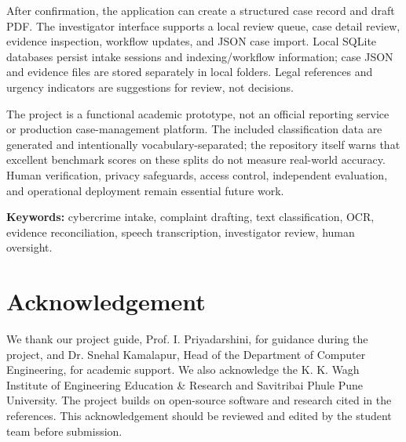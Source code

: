 \documentclass[12pt,a4paper,oneside]{report}
\begin{document}
After confirmation, the application can create a structured case record and draft PDF. The investigator interface supports a local review queue, case detail review, evidence inspection, workflow updates, and JSON case import. Local SQLite databases persist intake sessions and indexing/workflow information; case JSON and evidence files are stored separately in local folders. Legal references and urgency indicators are suggestions for review, not decisions.

The project is a functional academic prototype, not an official reporting service or production case-management platform. The included classification data are generated and intentionally vocabulary-separated; the repository itself warns that excellent benchmark scores on these splits do not measure real-world accuracy. Human verification, privacy safeguards, access control, independent evaluation, and operational deployment remain essential future work.

\textbf{Keywords:} cybercrime intake, complaint drafting, text classification, OCR, evidence reconciliation, speech transcription, investigator review, human oversight.

\clearpage\chapter*{Acknowledgement}
We thank our project guide, Prof. I. Priyadarshini, for guidance during the project, and Dr. Snehal Kamalapur, Head of the Department of Computer Engineering, for academic support. We also acknowledge the K. K. Wagh Institute of Engineering Education \& Research and Savitribai Phule Pune University. The project builds on open-source software and research cited in the references. This acknowledgement should be reviewed and edited by the student team before submission.
\end{document}
